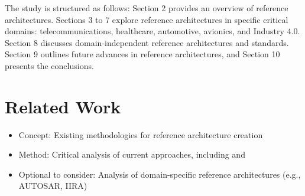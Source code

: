 \documentclass[12pt,a4paper]{article}
\begin{document}


The study is structured as follows: Section 2 provides an overview of reference architectures. Sections 3 to 7 explore reference architectures in specific critical domains: telecommunications, healthcare, automotive, avionics, and Industry 4.0. Section 8 discusses domain-independent reference architectures and standards. Section 9 outlines future advances in reference architectures, and Section 10 presents the conclusions.

\section{Related Work}
\begin{itemize}
    \item Concept: Existing methodologies for reference architecture creation
    \item Method: Critical analysis of current approaches, including \citet{Galster2011} and \citet{Nakagawa2014}
    \item Optional to consider: Analysis of domain-specific reference architectures (e.g., AUTOSAR, IIRA) \citep{Nakagawa2023}
\end{itemize}
\end{document}

